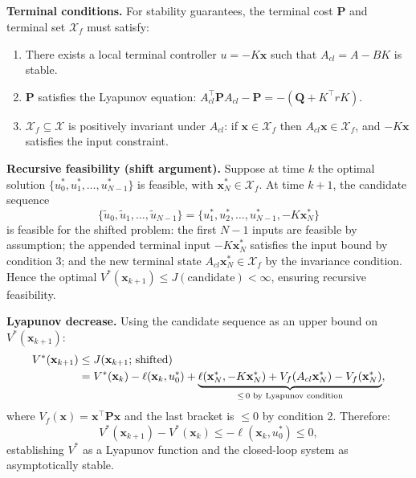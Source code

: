 \subsection{}
\textbf{Terminal conditions.} For stability guarantees, the terminal cost $\mathbf{P}$ and terminal set $\mathcal{X}_f$ must satisfy:
\begin{enumerate}
    \item There exists a local terminal controller $u = -K\mathbf{x}$ such that $A_{cl} = A - BK$ is stable.
    \item $\mathbf{P}$ satisfies the Lyapunov equation: $A_{cl}^\top\mathbf{P}A_{cl} - \mathbf{P} = -(\mathbf{Q} + K^\top rK)$.
    \item $\mathcal{X}_f \subseteq \mathcal{X}$ is positively invariant under $A_{cl}$: if $\mathbf{x} \in \mathcal{X}_f$ then $A_{cl}\mathbf{x} \in \mathcal{X}_f$, and $-K\mathbf{x}$ satisfies the input constraint.
\end{enumerate}

\textbf{Recursive feasibility (shift argument).} Suppose at time $k$ the optimal solution $\{u_0^*, u_1^*, \ldots, u_{N-1}^*\}$ is feasible, with $\mathbf{x}_N^* \in \mathcal{X}_f$. At time $k+1$, the candidate sequence
\begin{equation}
    \{\tilde{u}_0, \tilde{u}_1, \ldots, \tilde{u}_{N-1}\} = \{u_1^*, u_2^*, \ldots, u_{N-1}^*, -K\mathbf{x}_N^*\}
\end{equation}
is feasible for the shifted problem: the first $N-1$ inputs are feasible by assumption; the appended terminal input $-K\mathbf{x}_N^*$ satisfies the input bound by condition 3; and the new terminal state $A_{cl}\mathbf{x}_N^* \in \mathcal{X}_f$ by the invariance condition. Hence the optimal $V^*(\mathbf{x}_{k+1}) \leq J(\text{candidate}) < \infty$, ensuring recursive feasibility.

\textbf{Lyapunov decrease.} Using the candidate sequence as an upper bound on $V^*(\mathbf{x}_{k+1})$:
\begin{align}
    V^*(\mathbf{x}_{k+1}) &\leq J(\mathbf{x}_{k+1};\,\text{shifted}) \notag \\
    &= V^*(\mathbf{x}_k) - \ell(\mathbf{x}_k, u_0^*) + \underbrace{\ell(\mathbf{x}_N^*,-K\mathbf{x}_N^*) + V_f(A_{cl}\mathbf{x}_N^*) - V_f(\mathbf{x}_N^*)}_{\leq\, 0\text{ by Lyapunov condition}},
\end{align}
where $V_f(\mathbf{x}) = \mathbf{x}^\top\mathbf{P}\mathbf{x}$ and the last bracket is $\leq 0$ by condition 2. Therefore:
\begin{equation}
    V^*(\mathbf{x}_{k+1}) - V^*(\mathbf{x}_k) \leq -\ell(\mathbf{x}_k, u_0^*) \leq 0,
\end{equation}
establishing $V^*$ as a Lyapunov function and the closed-loop system as asymptotically stable.

